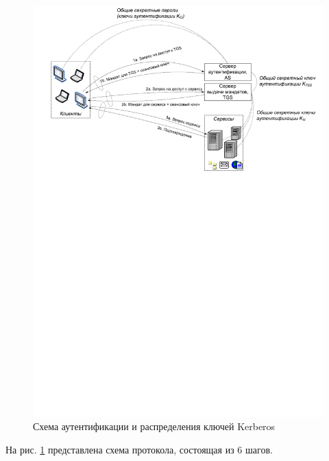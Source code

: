 \begin{figure}[h!]
	\centering
	\includegraphics[width=\textwidth]{pic/kerberos}
	\caption{Схема аутентификации и распределения ключей Kerberos\label{fig:kerberos}}
\end{figure}

На рис. \ref{fig:kerberos} представлена схема протокола, состоящая из 6 шагов.

